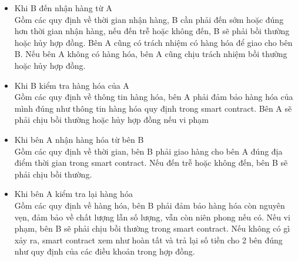\begin{itemize}
	\item Khi B đến nhận hàng từ A\\
	Gồm các quy định về thời gian nhận hàng, B cần phải đến sớm hoặc đúng hơn thời gian nhận hàng, nếu đến trễ hoặc không đến, B sẽ phải bồi thường hoặc hủy hợp đồng. Bên A cũng có trách nhiệm có hàng hóa để giao cho bên B. Nếu bên A không có hàng hóa, bên A cũng chịu trách nhiệm bồi thường hoặc hủy hợp đồng.
	
	\item Khi B kiểm tra hàng hóa của A\\
	Gồm các quy định về thông tin hàng hóa, bên A phải đảm bảo hàng hóa của mình đúng như thông tin hàng hóa quy định trong smart contract. Bên A sẽ phải chịu bồi thường hoặc hủy hợp đồng nếu vi phạm
	
	\item Khi bên A nhận hàng hóa từ bên B\\
	Gồm các quy định về thời gian, bên B phải giao hàng cho bên A đúng địa điểm thời gian trong smart contract. Nếu đến trễ hoặc không đến, bên B sẽ phải chịu bồi thường.
	
	\item Khi bên A kiểm tra lại hàng hóa\\
	Gồm các quy định về hàng hóa, bên B phải đảm bảo hàng hóa còn nguyên vẹn, đảm bảo về chất lượng lẫn số lượng, vẫn còn niên phong nếu có. Nếu vi phạm, bên B sẽ phải chịu bồi thường trong smart contract. Nếu không có gì xảy ra, smart contract xem như hoàn tất và trả lại số tiền cho 2 bên đúng như quy định của các điều khoản trong hợp đồng.
\end{itemize}